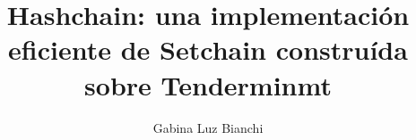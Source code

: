 \documentclass{book}
\title{Hashchain: una implementación eficiente de Setchain construída sobre Tenderminmt}
\author{Gabina Luz Bianchi}
\begin{document}
\maketitle

\tableofcontents{}




% 

% 


% 






% 


% 


% 


% 


% 



% 
\end{document}
